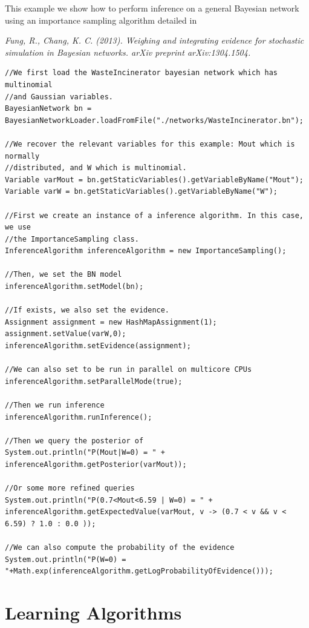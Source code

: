 This example we show how to perform inference on a general Bayesian network using an importance sampling
algorithm detailed in

\vspace{0.2cm}
\textit{Fung, R., Chang, K. C. (2013). Weighing and integrating evidence for stochastic simulation in Bayesian networks. arXiv preprint arXiv:1304.1504.
}

\begin{lstlisting}
//We first load the WasteIncinerator bayesian network which has multinomial 
//and Gaussian variables.
BayesianNetwork bn = BayesianNetworkLoader.loadFromFile("./networks/WasteIncinerator.bn");

//We recover the relevant variables for this example: Mout which is normally 
//distributed, and W which is multinomial.
Variable varMout = bn.getStaticVariables().getVariableByName("Mout");
Variable varW = bn.getStaticVariables().getVariableByName("W");

//First we create an instance of a inference algorithm. In this case, we use 
//the ImportanceSampling class.
InferenceAlgorithm inferenceAlgorithm = new ImportanceSampling();

//Then, we set the BN model
inferenceAlgorithm.setModel(bn);

//If exists, we also set the evidence.
Assignment assignment = new HashMapAssignment(1);
assignment.setValue(varW,0);
inferenceAlgorithm.setEvidence(assignment);

//We can also set to be run in parallel on multicore CPUs
inferenceAlgorithm.setParallelMode(true);

//Then we run inference
inferenceAlgorithm.runInference();

//Then we query the posterior of
System.out.println("P(Mout|W=0) = " + inferenceAlgorithm.getPosterior(varMout));

//Or some more refined queries
System.out.println("P(0.7<Mout<6.59 | W=0) = " + inferenceAlgorithm.getExpectedValue(varMout, v -> (0.7 < v && v < 6.59) ? 1.0 : 0.0 ));

//We can also compute the probability of the evidence
System.out.println("P(W=0) = "+Math.exp(inferenceAlgorithm.getLogProbabilityOfEvidence()));
\end{lstlisting}


\section{Learning Algorithms}

